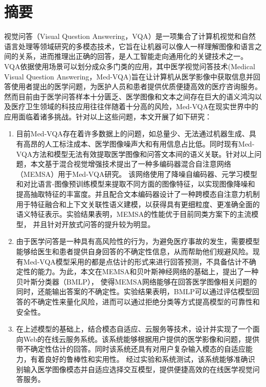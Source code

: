 \chapter{摘\texorpdfstring{\quad}{}要}
	视觉问答（Visual Question Answering，VQA）是一项集合了计算机视觉和自然语言处理等领域研究的多模态技术，它旨在让机器可以像人一样理解图像和语言之间的关系，进而推理出正确的回答，是人工智能走向通用化的关键技术之一。
	VQA依据使用场景可以划分成众多门类的应用，其中医学视觉问答技术(Medical Visual Question Answering，Med-VQA)旨在让计算机从医学影像中获取信息并回答使用者提出的医学问题，为医护人员和患者提供优质便捷高效的医疗咨询服务。
	然而目前由于医学问答样本十分匮乏、医学图像和文本之间存在巨大的语义鸿沟以及医疗卫生领域的科技应用往往伴随着十分高的风险，Med-VQA在现实世界中的应用面临着诸多挑战。针对以上这些问题，本文开展了如下研究：
	\begin{enumerate}[topsep = 0 pt, itemsep= 0 pt, parsep=0pt, partopsep=0pt, leftmargin=0pt, itemindent=44pt, labelsep=6pt, label=(\arabic*)]
		\item 目前Med-VQA存在着许多数据上的问题，如总量少、无法通过机器生成、具有高昂的人工标注成本、医学图像噪声大和有用信息占比低。同时现有Med-VQA方法和模型无法有效提取医学图像和问答文本间的语义关联。针对以上问题，本文基于混合视觉增强技术提出了一种多编码器混合自注意网络（MEMSA）用于Med-VQA研究。
		该网络使用了降噪自编码器、元学习模型和对比语言-图像预训练模型来提取不同方面的图像特征，以实现图像降噪和提高抽取特征的丰富度。并且配合文本编码器设计了一种跨模态自注意力机制用于特征融合和上下文关联性语义建模，以获得具有更细粒度、更准确全面的语义特征表示。实验结果表明，MEMSA的性能优于目前同类方案下的主流模型，
		并且针对开放式问答的提升较为明显。
		\item 由于医学问答是一种具有高风险性的行为，为避免医疗事故的发生，需要模型能够给医生和患者提供自身回答的不确定性信息，从而帮助他们规避风险。现有Med-VQA模型采用的都是点估计的形式来进行回答预测，不具备估计不确定性的能力。为此，本文在MEMSA和贝叶斯神经网络的基础上，提出了一种贝叶斯分类器（BMLP），
		使得MEMSA网络能够在回答医学图像相关问题的同时，还能输出答案的不确定性。实验结果表明，BMLP可以通过评估模型回答的不确定性来量化风险，进而可以通过拒绝分类等方式提高模型的可靠性和安全性。
		\item 在上述模型的基础上，结合模态自适应、云服务等技术，设计并实现了一个面向Web的在线云服务系统。该系统能够根据用户提供的医学影像和问题，提供带不确定性估计的回答。同时该系统还具有对用户复杂输入模态的自适应能力，有着良好的鲁棒性和实用性。
		经过实验和系统测试，该系统能够准确识别输入医学图像模态并自适应选择交互模型，提供便捷高效的在线医学视觉问答服务。
	\end{enumerate}	

